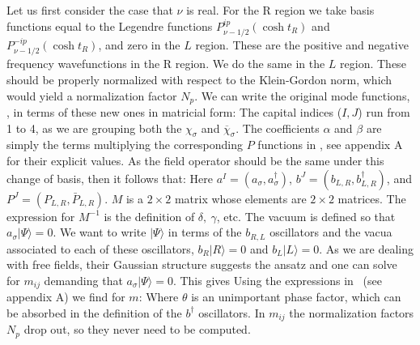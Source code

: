 Let us first consider the case that $\nu$ is real.
For the R region we take  basis functions equal to  the Legendre functions $P^{ip}_{\nu-1/2}(\cosh t_R)$ and $P^{-ip}_{\nu-1/2}(\cosh t_R)$, and zero in the $L$ region. These are the positive and negative frequency
 wavefunctions in the R region.  We do the same in the $L$ region.
 These should be properly normalized with respect to the Klein-Gordon norm, which would yield a normalization factor $N_p$. We can write the original mode functions, \wavef ,  in terms of these new ones in matricial form:
\eqn{}
The capital indices ($I,J$)
 run from 1 to 4, as we are grouping both the $\chi_\sigma$ and $\overline \chi_\sigma$.
The coefficients $\alpha$ and $\beta$ are simply the terms multiplying the corresponding $P$ functions in
\wavef , see appendix A for their explicit values.
 As the field operator should be the same under this change of basis, then it follows that:
\eqn{}
Here $a^I=(a_\sigma, a^\dagger_\sigma)$, $b^J = ( b_{L,R}, b^\dagger_{L,R})$, and $P^J = ( P_{L,R}, \bar P_{L,R} ) $. $M$ is a $2\times2$ matrix whose elements are $2\times 2$ matrices. The expression for
$M^{-1}$ is the definition of $\delta , ~\gamma $, etc.
The vacuum is defined so that $a_\sigma | \Psi \rangle = 0$. We want to write $|\Psi\rangle$ in terms of the $b_{R,L}$ oscillators and the vacua associated to each of these oscillators, $b_R|R\rangle =0$ and $b_L|L\rangle = 0$. As we are dealing with free fields, their Gaussian structure suggests the ansatz
\eqn{}
 and one can solve for $m_{ij}$ demanding that $a_\sigma |\Psi \rangle =0$. This gives
\eqn{}
Using the expressions in \wavef\ (see appendix A)  we find for $m$:
\eqn{}
Where $\theta$ is an unimportant phase factor, which can be absorbed in the definition of the $b^\dagger$ oscillators. In $m_{ij}$ the normalization factors $N_p$ drop out, so they never need to be computed.


